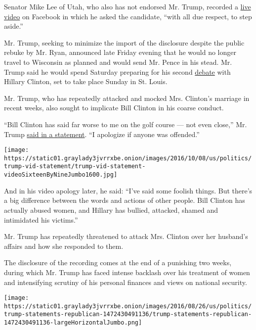 Senator Mike Lee of Utah, who also has not endorsed Mr. Trump, recorded
a
\href{https://www.facebookcorewwwi.onion/mikeleeUT/videos/10154626306667431/?hc_ref=NEWSFEED}{live
video} on Facebook in which he asked the candidate, ``with all due
respect, to step aside.''

Mr. Trump, seeking to minimize the import of the disclosure despite the
public rebuke by Mr. Ryan, announced late Friday evening that he would
no longer travel to Wisconsin as planned and would send Mr. Pence in his
stead. Mr. Trump said he would spend Saturday preparing for his second
\href{http://www.nytimes3xbfgragh.onion/2016/10/09/us/politics/presidential-debate.html}{debate}
with Hillary Clinton, set to take place Sunday in St. Louis.

Mr. Trump, who has repeatedly attacked and mocked Mrs. Clinton's
marriage in recent weeks, also sought to implicate Bill Clinton in his
coarse conduct.

``Bill Clinton has said far worse to me on the golf course --- not even
close,'' Mr. Trump
\href{https://www.donaldjtrump.com/press-releases/statement-from-donald-j.-trump}{said
in a statement}. ``I apologize if anyone was offended.''

\texttt{[image: https://static01.graylady3jvrrxbe.onion/images/2016/10/08/us/politics/trump-vid-statement/trump-vid-statement-videoSixteenByNineJumbo1600.jpg]}

And in his video apology later, he said: ``I've said some foolish
things. But there's a big difference between the words and actions of
other people. Bill Clinton has actually abused women, and Hillary has
bullied, attacked, shamed and intimidated his victims.''

Mr. Trump has repeatedly threatened to attack Mrs. Clinton over her
husband's affairs and how she responded to them.

The disclosure of the recording comes at the end of a punishing two
weeks, during which Mr. Trump has faced intense backlash over his
treatment of women and intensifying scrutiny of his personal finances
and views on national security.

\href{https://www.nytimes3xbfgragh.onion/interactive/2016/08/29/us/politics/at-least-110-republican-leaders-wont-vote-for-donald-trump-heres-when-they-reached-their-breaking-point.html}{}

\texttt{[image: https://static01.graylady3jvrrxbe.onion/images/2016/08/26/us/politics/trump-statements-republican-1472430491136/trump-statements-republican-1472430491136-largeHorizontalJumbo.png]}

